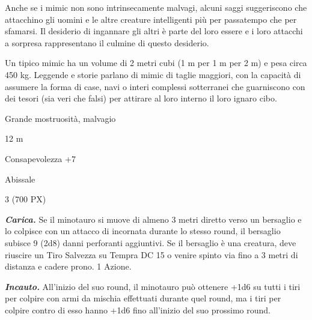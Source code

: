 \begin{multicols}{2}
{Anche se i mimic non sono intrinsecamente malvagi, alcuni saggi suggeriscono che attacchino gli uomini e le altre creature intelligenti più per passatempo che per sfamarsi. Il desiderio di ingannare gli altri è parte del loro essere e i loro attacchi a sorpresa rappresentano il culmine di questo desiderio.

Un tipico mimic ha un volume di 2 metri cubi (1 m per 1 m per 2 m) e pesa circa 450 kg. Leggende e storie parlano di mimic di taglie maggiori, con la capacità di assumere la forma di case, navi o interi complessi sotterranei che guarniscono con dei tesori (sia veri che falsi) per attirare al loro interno il loro ignaro cibo.

\begin{description}[noitemsep, topsep=0pt, parsep=0pt, partopsep=0pt, itemsep=1pt, leftmargin=2.35cm,  labelwidth=2.2cm, itemindent=0cm, listparindent=0pt] %
\setlength{\baselineskip}{10pt}
\item[\textbf{Taglia/Tipo}] Grande mostruosità, malvagio
\item[\textbf{Caratt.}] 
\item[\textbf{Punti Ferita}] 
\item[\textbf{Movimento}] 12 m
\item[\textbf{Tiri Salvez.}] 
\item[\textbf{Comp.}] Consapevolezza +7
\item[\textbf{Sensi}] 
\item[\textbf{Linguaggi}] Abissale
\item[\textbf{Sfida}] 3 (700 PX)
\end{description}
\smallskip

\emph{\textbf{Carica.}} Se il minotauro si muove di almeno 3 metri diretto verso un bersaglio e lo colpisce con un attacco di incornata durante lo stesso round, il bersaglio subisce 9 (2d8) danni perforanti aggiuntivi. Se il bersaglio è una creatura, deve riuscire un Tiro Salvezza su Tempra DC 15 o venire spinto via fino a 3 metri di distanza e cadere prono. 1 Azione.

\emph{\textbf{Incauto.}} All'inizio del suo round, il minotauro può ottenere +1d6 su tutti i tiri per colpire con armi da mischia effettuati durante quel round, ma i tiri per colpire contro di esso hanno +1d6 fino all'inizio del suo prossimo round.

}
\end{multicols}
